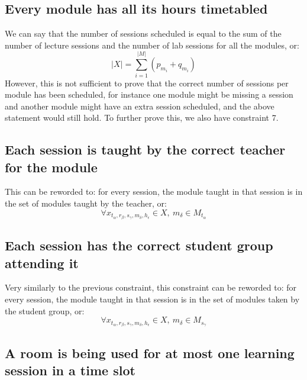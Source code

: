 \subsection{Every module has all its hours timetabled}

We can say that the number of sessions scheduled is equal to the sum of the 
number of lecture sessions and the number of lab sessions for all the modules, 
or:
\begin{equation*}
	\lvert X \rvert = \sum_{i=1}^{\lvert M \rvert} (p_{m_i} + q_{m_i})
\end{equation*}
However, this is not sufficient to prove that the correct number of sessions per
module has been scheduled, for instance one module might be missing a session 
and another module might have an extra session scheduled, and the above 
statement would still hold. To further prove this, we also have constraint 7.

\subsection{Each session is taught by the correct teacher for the module}

This can be reworded to: for every session, the module taught in that session is
in the set of modules taught by the teacher, or:
\begin{equation*}
	\forall x_{t_{\alpha},r_{\beta},s_{\gamma},m_{\delta},h_{\epsilon}} \in X,
	\: m_{\delta} \in M_{t_{\alpha}}
\end{equation*}

\subsection{Each session has the correct student group attending it}

Very similarly to the previous constraint, this constraint can be reworded to: 
for every session, the module taught in that session is in the set of modules 
taken by the student group, or:
\begin{equation*}
	\forall x_{t_{\alpha},r_{\beta},s_{\gamma},m_{\delta},h_{\epsilon}} \in X,
	\: m_{\delta} \in M_{s_{\gamma}}
\end{equation*}

\subsection{A room is being used for at most one learning session in a time 
	slot}

